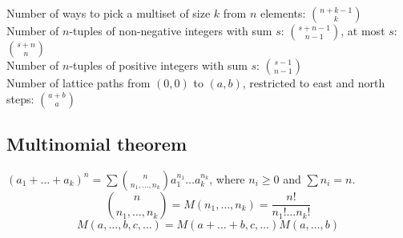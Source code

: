 \documentclass[12pt]{extarticle}
\begin{document}
\begin{multicols*}{2}
\iffalse
\begin{tabular}{r|rrrrrrrrrrrrr}
    & $0$ & $1$ & $2$ & $3$ & $4$ & $5$ & $6$ & $7$ & $8$ & $9$ & $10$ & $11$ & $12$ \\
    \hline
    $0$ & $1$\\
    $1$ & $1$ & $1$\\
    $2$ & $1$ & $2$ & $1$\\
    $3$ & $1$ & $3$ & $3$ & $1$\\
    $4$ & $1$ & $4$ & $6$ & $4$ & $1$\\
    $5$ & $1$ & $5$ & $10$ & $10$ & $5$ & $1$\\
    $6$ & $1$ & $6$ & $15$ & $20$ & $15$ & $6$ & $1$\\
    $7$ & $1$ & $7$ & $21$ & $35$ & $35$ & $21$ & $7$ & $1$\\
    $8$ & $1$ & $8$ & $28$ & $56$ & $70$ & $56$ & $28$ & $8$ & $1$\\
    $9$ & $1$ & $9$ & $36$ & $84$ & $126$ & $126$ & $84$ & $36$ & $9$ & $1$\\
    $10$ & $1$ & $10$ & $45$ & $120$ & $210$ & $252$ & $210$ & $120$ & $45$ & $10$ & $1$\\
    $11$ & $1$ & $11$ & $55$ & $165$ & $330$ & $462$ & $462$ & $330$ & $165$ & $55$ & $11$ & $1$\\
    $12$ & $1$ & $12$ & $66$ & $220$ & $495$ & $792$ & $924$ & $792$ & $495$ & $220$ & $66$ & $12$ & $1$ \\
    \hline
    & $0$ & $1$ & $2$ & $3$ & $4$ & $5$ & $6$ & $7$ & $8$ & $9$ & $10$ & $11$ & $12$
\end{tabular}
\fi

Number of ways to pick a multiset of size $k$ from $n$ elements: ${n+k-1 \choose k}$ \\
Number of $n$-tuples of non-negative integers with sum $s$:
${{s+n-1} \choose {n-1}}$, at most $s$: ${{s + n} \choose {n}}$ \\
Number of $n$-tuples of positive integers with sum $s$:
${{s-1} \choose {n-1}}$ \\
Number of lattice paths from $(0,0)$ to $(a,b)$, restricted to east and north
steps: ${a+b \choose a}$


\subsection{Multinomial theorem}
$(a_1+\dots+a_k)^n = \sum {n \choose n_1,\dots,n_k} a_1^{n_1} \dots a_k^{n_k}$,
where $n_i \ge 0$ and $\sum n_i=n$. \\
$${n \choose n_1,\dots,n_k} = M(n_1,\dots,n_k) = \frac{n!}{n_1! \dots n_k!}$$
$$M(a,\dots,b,c,\dots) = M(a+\dots+b,c,\dots) M(a,\dots,b)$$



\end{multicols*}
\end{document}
